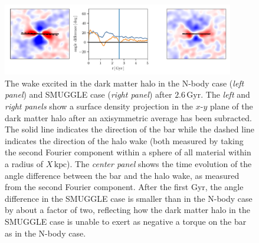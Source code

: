 \documentclass{natureprintstyle}
\begin{document}
\begin{figure}[h]%
\centering
\includegraphics[width=0.9\textwidth]{fig/fig3.pdf}
\caption{The wake excited in the dark matter halo in the N-body case
(\textit{left panel}) and SMUGGLE case (\textit{right panel}) after
$2.6\,\textrm{Gyr}$. The \textit{left} and \textit{right panels} show a
surface density projection in the $x$-$y$ plane of the dark matter halo after
an axisymmetric average has been subracted. The solid line indicates the
direction of the bar while the dashed line indicates the direction of the halo
wake (both measured by taking the second Fourier component within a sphere of
all material within a radius of $X\,\textrm{kpc}$). The \textit{center panel}
shows the time evolution of the angle difference between the bar and the halo
wake, as measured from the second Fourier component. After the first Gyr, the
angle difference in the SMUGGLE case is smaller than in the N-body case by
about a factor of two, reflecting how the dark matter halo in the SMUGGLE case
is unable to exert as negative a torque on the bar as in the N-body
case.}\label{fig:wake}
\end{figure}
\end{document}

